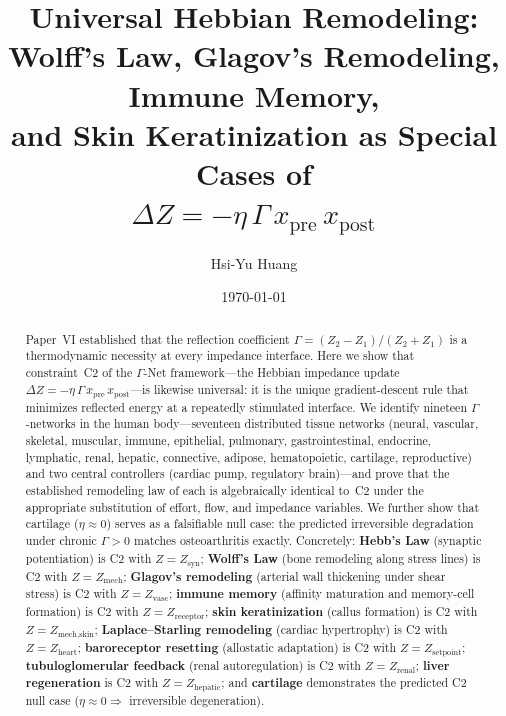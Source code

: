 \documentclass[aps,pre,twocolumn,superscriptaddress,floatfix]{revtex4-2}
\begin{document}
\title{Universal Hebbian Remodeling:\\
Wolff's Law, Glagov's Remodeling, Immune Memory,\\
and Skin Keratinization as Special Cases of\\
$\Delta Z = -\eta\,\Gamma\,x_{\text{pre}}\,x_{\text{post}}$}

\author{Hsi-Yu Huang}

\date{\today}

\begin{abstract}
Paper~VI established that the reflection coefficient
$\Gamma = (Z_2 - Z_1)/(Z_2 + Z_1)$ is a thermodynamic
necessity at every impedance interface.
Here we show that constraint~C2 of the $\Gamma$-Net
framework---the Hebbian impedance update
$\Delta Z = -\eta\,\Gamma\,x_{\text{pre}}\,x_{\text{post}}$---is
likewise universal: it is the unique gradient-descent rule
that minimizes reflected energy at a repeatedly stimulated
interface.
We identify nineteen $\Gamma$-networks in the
human body---seventeen distributed tissue networks
(neural, vascular, skeletal, muscular, immune, epithelial,
pulmonary, gastrointestinal, endocrine, lymphatic,
renal, hepatic, connective, adipose, hematopoietic,
cartilage, reproductive)
and two central controllers (cardiac pump, regulatory
brain)---and prove that the established remodeling
law of each is algebraically identical to~C2 under
the appropriate substitution of effort, flow, and impedance
variables.
We further show that cartilage ($\eta \approx 0$) serves
as a falsifiable null case: the predicted irreversible
degradation under chronic $\Gamma > 0$ matches
osteoarthritis exactly.
Concretely: \textbf{Hebb's Law} (synaptic potentiation)
is C2 with $Z = Z_{\text{syn}}$;
\textbf{Wolff's Law} (bone remodeling along stress lines)
is C2 with $Z = Z_{\text{mech}}$;
\textbf{Glagov's remodeling} (arterial wall thickening under
shear stress) is C2 with $Z = Z_{\text{vasc}}$;
\textbf{immune memory} (affinity maturation and memory-cell
formation) is C2 with $Z = Z_{\text{receptor}}$;
\textbf{skin keratinization} (callus formation) is C2
with $Z = Z_{\text{mech,skin}}$;
\textbf{Laplace--Starling remodeling} (cardiac hypertrophy)
is C2 with $Z = Z_{\text{heart}}$;
\textbf{baroreceptor resetting} (allostatic adaptation)
is C2 with $Z = Z_{\text{setpoint}}$;
\textbf{tubuloglomerular feedback} (renal autoregulation)
is C2 with $Z = Z_{\text{renal}}$;
\textbf{liver regeneration} is C2 with $Z = Z_{\text{hepatic}}$;
and \textbf{cartilage} demonstrates the predicted C2 null
case ($\eta \approx 0 \Rightarrow$ irreversible degeneration).


\end{abstract}
\end{document}
